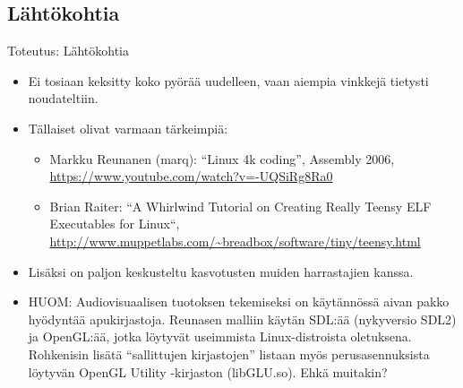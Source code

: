 \documentclass[pdf,10pt,handout]{beamer}
\begin{document}
\subsection{Lähtökohtia}
\begin{frame}{Toteutus: Lähtökohtia}
\begin{itemize}
\item
Ei tosiaan keksitty koko pyörää uudelleen, vaan aiempia vinkkejä
tietysti noudateltiin.
\item Tällaiset olivat varmaan tärkeimpiä:
  \begin{itemize}
    \item Markku Reunanen (marq): ``Linux 4k coding'', Assembly 2006,
      \url{https://www.youtube.com/watch?v=-UQSiRg8Ra0}
    \item Brian Raiter: ``A Whirlwind Tutorial on Creating Really
      Teensy ELF Executables for Linux``, 
      \url{http://www.muppetlabs.com/~breadbox/software/tiny/teensy.html}
  \end{itemize}
\item
   Lisäksi on paljon keskusteltu kasvotusten muiden harrastajien
   kanssa.
\item
HUOM: Audiovisuaalisen tuotoksen tekemiseksi on käytännössä aivan
pakko hyödyntää apukirjastoja. Reunasen malliin käytän SDL:ää
(nykyversio SDL2) ja OpenGL:ää, jotka löytyvät useimmista
Linux-distroista oletuksena. Rohkenisin lisätä ``sallittujen
kirjastojen'' listaan myös perusasennuksista löytyvän OpenGL Utility
-kirjaston (libGLU.so). Ehkä muitakin?
\end{itemize}
\end{frame}
\end{document}
